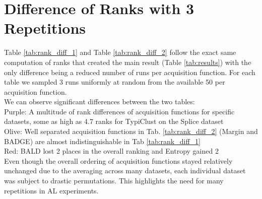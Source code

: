 \documentclass[]{article}
\begin{document}
\section{Difference of Ranks with 3 Repetitions}\label{app:rank_difference}
Table \ref{tab:rank_diff_1} and Table \ref{tab:rank_diff_2} follow the exact same computation of ranks that created the main result (Table \ref{tab:results}) with the only difference being a reduced number of runs per acquisition function.
For each table we sampled 3 runs uniformly at random from the available 50 per acquisition function. \\
We can observe significant differences between the two tables: \\
{\color{purple}Purple}: A multitude of rank differences of acquisition functions for specific datasets, some as high as 4.7 ranks for TypiClust on the Splice dataset \\
{\color{olive}Olive}: Well separated acquisition functions in Tab. \ref{tab:rank_diff_2} (Margin and BADGE) are almost indistinguishable in Tab \ref{tab:rank_diff_1} \\
{\color{red}Red}: BALD lost 2 places in the overall ranking and Entropy gained 2 \\ [1mm]
Even though the overall ordering of acquisition functions stayed relatively unchanged due to the averaging across many datasets, each individual dataset was subject to drastic permutations.
This highlights the need for many repetitions in AL experiments.
\end{document}
